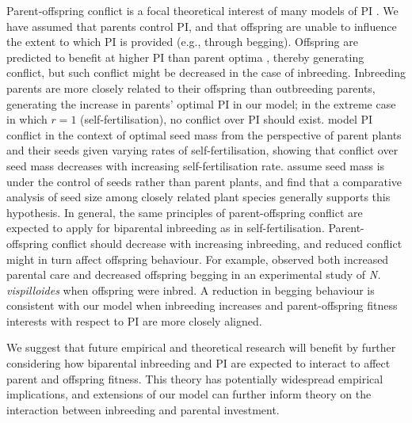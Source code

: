 \documentclass[12pt]{article}
\begin{document}
Parent-offspring conflict is a focal theoretical interest of many models of PI \cite[e.g.,][]{Macnair1978, Parker1978, Parker1985, DeJong2005}. We have assumed that parents control PI, and that offspring are unable to influence the extent to which PI is provided (e.g., through begging). Offspring are predicted to benefit at higher PI than parent optima \cite[][]{Parker1978, Parker2002}, thereby generating conflict, but such conflict might be decreased in the case of inbreeding. Inbreeding parents are more closely related to their offspring than outbreeding parents, generating the increase in parents' optimal PI in our model; in the extreme case in which $r=1$ (self-fertilisation), no conflict over PI should exist. \cite{DeJong2005} model PI conflict in the context of optimal seed mass from the perspective of parent plants and their seeds given varying rates of self-fertilisation, showing that conflict over seed mass decreases with increasing self-fertilisation rate. \cite{DeJong2005} assume seed mass is under the control of seeds rather than parent plants, and find that a comparative analysis of seed size among closely related plant species generally supports this hypothesis. In general, the same principles of parent-offspring conflict are expected to apply for biparental inbreeding as in self-fertilisation. Parent-offspring conflict should decrease with increasing inbreeding, and reduced conflict might in turn affect offspring behaviour. For example, \cite{Mattey2014} observed both increased parental care and decreased offspring begging in an experimental study of \textit{N. vispilloides} when offspring were inbred. A reduction in begging behaviour is consistent with our model when inbreeding increases and parent-offspring fitness interests with respect to PI are more closely aligned.

We suggest that future empirical and theoretical research will benefit by further considering how biparental inbreeding and PI are expected to interact to affect parent and offspring fitness. This theory has potentially widespread empirical implications, and extensions of our model can further inform theory on the interaction between inbreeding and parental investment.

\end{document}
